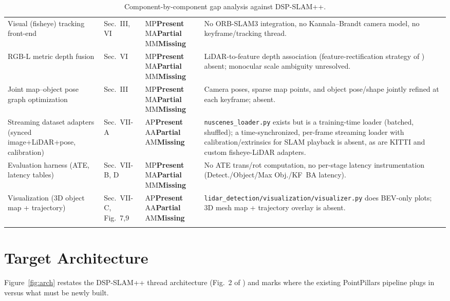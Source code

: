 \documentclass[11pt]{article}
\newcommand{\status}[1]{%
  \ifx#1P\textcolor{blue!60!black}{\textbf{Present}}\fi
  \ifx#1A\textcolor{orange!80!black}{\textbf{Partial}}\fi
  \ifx#1M\textcolor{red!70!black}{\textbf{Missing}}\fi
}
\begin{document}
\begin{longtable}{p{4.1cm}p{1.6cm}p{1.5cm}p{6.3cm}}
Visual (fisheye) tracking front-end & Sec.~III, VI & \status{M} & No ORB-SLAM3 \cite{campos2021orbslam3} integration, no Kannala--Brandt \cite{kannala2006generic} camera model, no keyframe/tracking thread. \\
RGB-L metric depth fusion & Sec.~VI & \status{M} & LiDAR-to-feature depth association (feature-rectification strategy of \cite{sauerbeck2022rgbl}) absent; monocular scale ambiguity unresolved. \\
Joint map--object pose graph optimization & Sec.~III & \status{M} & Camera poses, sparse map points, and object pose/shape jointly refined at each keyframe; absent. \\
Streaming dataset adapters (synced image+LiDAR+pose, calibration) & Sec.~VII-A & \status{A} & \texttt{nuscenes\_loader.py} exists but is a training-time loader (batched, shuffled); a time-synchronized, per-frame streaming loader with calibration/extrinsics for SLAM playback is absent, as are KITTI and custom fisheye-LiDAR adapters. \\
Evaluation harness (ATE, latency tables) & Sec.~VII-B, D & \status{M} & No ATE trans/rot computation, no per-stage latency instrumentation (Detect./Object/Max Obj./KF~BA latency). \\
Visualization (3D object map + trajectory) & Sec.~VII-C, Fig.~7,9 & \status{A} & \texttt{lidar\_detection/visualization/visualizer.py} does BEV-only plots; 3D mesh map + trajectory overlay is absent. \\
\bottomrule
\caption{Component-by-component gap analysis against DSP-SLAM++.}
\label{tab:gap}
\end{longtable}

\section{Target Architecture}

Figure~\ref{fig:arch} restates the DSP-SLAM++ thread architecture (Fig.~2 of \cite{kourani2026dspslampp}) and marks where the existing PointPillars pipeline plugs in versus what must be newly built.
\end{document}
